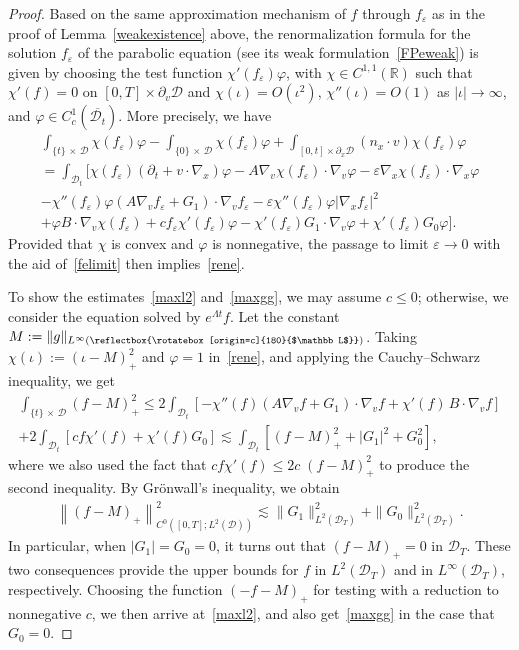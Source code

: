 \documentclass[10pt]{amsart}
\theoremstyle{definition}\newtheorem{defi}[theo]{Definition}\newtheorem{rema}[theo]{Remark}\newtheorem{exam}[theo]{Example}\newtheorem{exem}[theo]{Example}\newtheorem{nota}[theo]{Notation}
\newcommand*\p{\partial}
\newcommand*\R {\mathbb{R}}
\newcommand*\D {\mathcal{D}}
\newcommand\GG{\reflectbox{\rotatebox[origin=c]{180}{$\mathbb L$}}}
\begin{document}
\begin{proof}
Based on the same approximation mechanism of $f$ through $f_\varepsilon$ as in the proof of Lemma~\ref{weakexistence} above, the renormalization formula for the solution $f_\varepsilon$ of the parabolic equation (see its weak formulation~\eqref{FPeweak}) is given by choosing the test function $\chi'(f_\varepsilon)\varphi$, with $\chi\in C^{1,1}(\R)$ such that $\chi'(f)=0$ on $[0,T]\times\p_v\D$ and $\chi(\iota)=O(\iota^2)$, $\chi''(\iota)=O(1)$ as $|\iota|\rightarrow\infty$, and $\varphi\in C_c^1(\overline{\D_t})$. More precisely, we have
\begin{multline*}
\int_{\{t\}\,\times\,\D}\chi(f_\varepsilon)\varphi-\int_{\{0\}\,\times\,\D}\chi(f_\varepsilon)\varphi + \int_{[0,t]\times\p_x\D} (n_x\cdot v) \chi(f_\varepsilon)\varphi \\
=\int_{\D_t} \big[\chi(f_\varepsilon)(\p_t+v\cdot\nabla_x)\varphi -A\nabla_v\chi(f_\varepsilon)\cdot\nabla_v\varphi -\varepsilon\nabla_x\chi(f_\varepsilon)\cdot\nabla_x\varphi\\
-\chi''(f_\varepsilon)\varphi (A\nabla_vf_\varepsilon+G_1)\cdot\nabla_vf_\varepsilon -\varepsilon\chi''(f_\varepsilon)\varphi
\left|\nabla_xf_\varepsilon\right|^2\\
+ \varphi B\cdot\nabla_v\chi(f_\varepsilon) + c f_\varepsilon\chi'(f_\varepsilon) \varphi -\chi'(f_\varepsilon)G_1\cdot\nabla_v\varphi + \chi'(f_\varepsilon)G_0\varphi\big].
\end{multline*}
Provided that $\chi$ is convex and $\varphi$ is nonnegative, the passage to limit $\varepsilon\rightarrow0$ with the aid of~\eqref{felimit} then implies~\eqref{rene}.

To show the estimates~\eqref{maxl2} and~\eqref{maxgg}, we may assume $c\le0$; otherwise, we consider the equation solved by $e^{\Lambda t}f$. Let the constant $M:=\|g\|_{L^\infty(\small\GG)}$. Taking $\chi(\iota):=(\iota-M)_+^2$ and $\varphi=1$ in~\eqref{rene}, and applying the Cauchy--Schwarz inequality, we get
\begin{multline*}
\int_{\{t\}\,\times\,\D}(f-M)_+^2
\le 2\int_{\D_t} \left[-\chi''(f)\left(A\nabla_vf+G_1\right)\cdot\nabla_vf + \chi'(f)\, B\cdot\nabla_vf\right]\\
+2\int_{\D_t} \left[c f\chi'(f) + \chi'(f)G_0\right]\lesssim \int_{\D_t}\left[(f-M)_+^2 +|G_1|^2 +G_0^2\right],
\end{multline*}
where we also used the fact that $cf\chi'(f)\le 2c\;\!(f-M)_+^2$ to produce the second inequality. By Gr\"onwall’s inequality, we obtain
\begin{align*}
\left\|(f-M)_+\right \|_{C^0\left([0,T];L^2(\D)\right)}^2
\lesssim \|G_1\|_{L^2(\D_T)}^2 +\|G_0\|_{L^2(\D_T)}^2.
\end{align*}
In particular, when $|G_1|=G_0=0$, it turns out that $(f-M)_+=0$ in $\D_T$. These two consequences provide the upper bounds for $f$ in $L^2(\D_T)$ and in $L^\infty(\D_T)$, respectively. Choosing the function $(-f-M)_+$ for testing with a reduction to nonnegative $c$, we then arrive at~\eqref{maxl2}, and also get~\eqref{maxgg} in the case that $G_0=0$.


\end{proof}
\end{document}
